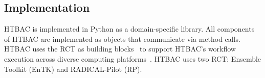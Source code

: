 


\subsection{Implementation}

HTBAC is implemented in Python as a domain-specific library. All components
of HTBAC are implemented as objects that communicate via method calls. HTBAC
uses the RCT as building blocks~\cite{review_bb_2016} to support HTBAC's
workflow execution across diverse computing
platforms~\cite{turilli2017comprehensive}. HTBAC uses two RCT: Ensemble
Toolkit (EnTK) and RADICAL-Pilot (RP).


